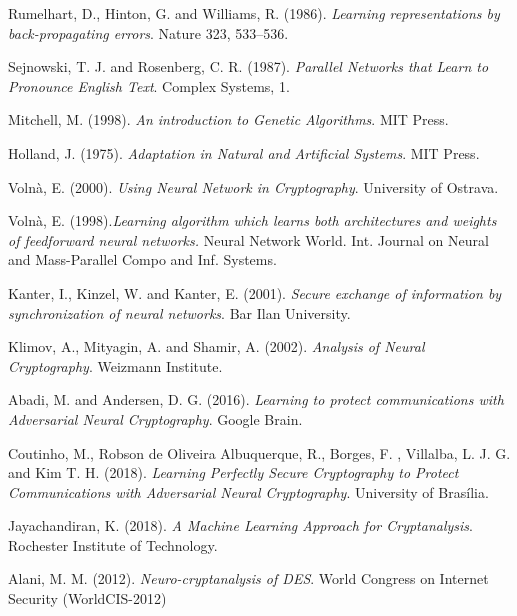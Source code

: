 \documentclass[%
    corpo=11pt,
    twoside,
    stile=classica,
    oldstyle,
    autoretitolo,
    tipotesi=magistrale,
    greek,
    evenboxes,
    english
]{toptesi}
\begin{document}
\begin{thebibliography}{99}
 {\sc Rumelhart, D.}, {\sc Hinton, G.} and {\sc Williams, R.} (1986). \textit{Learning representations by back-propagating errors}. Nature 323, 533–536.

 {\sc Sejnowski, T. J.} and {\sc Rosenberg, C. R.} (1987). \textit{Parallel Networks that Learn to Pronounce English Text}. Complex Systems, 1.

 {\sc Mitchell, M.} (1998). \textit{An introduction to Genetic Algorithms}. MIT Press.

 {\sc Holland, J.} (1975). \textit{Adaptation in Natural and Artificial Systems}. MIT Press. 

 {\sc Volnà, E.} (2000). \textit{Using Neural Network in Cryptography}. University of Ostrava.

 {\sc Volnà, E.} (1998).\textit{Learning algorithm which learns both architectures and weights of feedforward neural networks.} Neural Network World. Int. Journal on Neural and Mass-Parallel Compo and Inf. Systems.

 {\sc Kanter, I.}, {\sc Kinzel, W.} and {\sc Kanter, E.} (2001). \textit{Secure exchange of information by synchronization of neural networks}. Bar Ilan University.

 {\sc Klimov, A.}, {\sc Mityagin, A.} and {\sc Shamir, A.} (2002). \textit{Analysis of Neural Cryptography}. Weizmann Institute.


 {\sc Abadi, M.} and {\sc Andersen, D. G.} (2016). \textit{Learning to protect communications with Adversarial Neural Cryptography}. Google Brain.

 {\sc Coutinho, M.}, {\sc Robson de Oliveira Albuquerque, R.}, {\sc Borges, F. }, {\sc Villalba, L. J. G.} and  {\sc Kim T. H.} (2018). \textit{Learning Perfectly Secure Cryptography to Protect Communications with Adversarial Neural Cryptography}. University of Brasília.

 {\sc Jayachandiran, K.} (2018). \textit{A Machine Learning Approach for Cryptanalysis}. Rochester Institute of Technology.

 {\sc Alani, M. M.} (2012). \textit{Neuro-cryptanalysis of DES}. World Congress on Internet Security (WorldCIS-2012)


\end{thebibliography}
\end{document}
